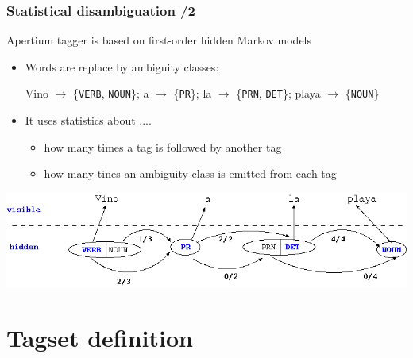 \documentclass{beamer} %
\begin{document}
\begin{frame}
  \frametitle{Statistical disambiguation /2}

  Apertium tagger is based on first-order hidden Markov models

  \begin{block}{}
  \begin{itemize}
  \item Words are replace by \alert{ambiguity classes}:\\
    \begin{small}
      Vino $\rightarrow$ \{\texttt{VERB}, \texttt{NOUN}\};
      a $\rightarrow$ \{\texttt{PR}\};
      la $\rightarrow$ \{\texttt{PRN}, \texttt{DET}\};
      playa $\rightarrow$ \{\texttt{NOUN}\} 
    \end{small}

  \item It uses statistics about ....
    \begin{itemize}
    \item how many times a tag is followed by another tag
    \item how many tines an ambiguity class is \alert{emitted} from
      each tag
    \end{itemize}
  \end{itemize}
  \end{block}

  \begin{center}
    \includegraphics[scale=0.41]{sentence-hmm.png}
  \end{center}
\end{frame}


\section{Tagset definition}
\end{document}
